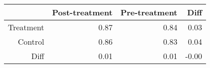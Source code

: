 \begin{table}[ht]
\centering
\begin{tabular}{rrrr}
  \hline
 & Post-treatment & Pre-treatment & Diff \\ 
  \hline
Treatment & 0.87 & 0.84 & 0.03 \\ 
  Control & 0.86 & 0.83 & 0.04 \\ 
  Diff & 0.01 & 0.01 & -0.00 \\ 
   \hline
\end{tabular}
\end{table}

